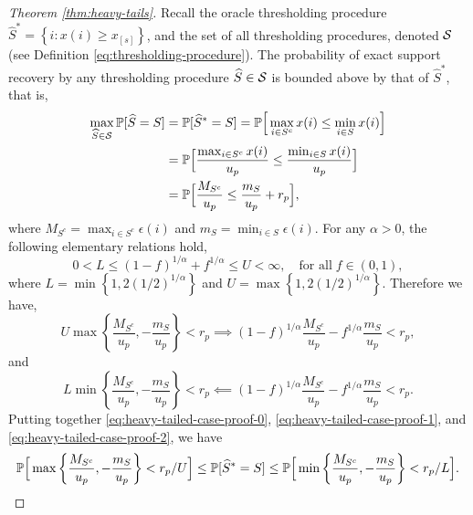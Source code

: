 \begin{proof}[Theorem \ref{thm:heavy-tails}]
Recall the oracle thresholding procedure $\widehat{S}^* = \left\{i:x(i) \ge x_{[s]}\right\}$, and the set of all thresholding procedures, denoted 
${\cal S}$ (see Definition \ref{eq:thresholding-procedure}).
The probability of exact support recovery by any thresholding procedure $\widehat{S}\in{\cal S}$ is bounded above by that of $\widehat{S}^*$, that is,
\begin{align}
    \max_{\widehat{S}\in{\cal S}}\P[\widehat{S}=S] 
        &= \P[\widehat{S}^*=S] 
        = \P\Big[\max_{i\in S^c}x(i) \le \min_{i\in S}x(i)\Big] \nonumber \\
        &= \P\Big[\frac{\max_{i\in S^c}x(i)}{u_p} \le \frac{\min_{i\in S}x(i)}{u_p}\Big] \nonumber \\
        &= \P\Big[\frac{M_{S^c}}{u_p} \le \frac{m_S}{u_p} + r_p\Big], \label{eq:heavy-tailed-case-proof-0}
\end{align}
where $M_{S^c} = \max_{i\in S^c}\epsilon(i)$ and $m_S = \min_{i\in S}\epsilon(i)$.
For any $\alpha > 0$, the following elementary relations hold,
\begin{equation*}
    0 < L \le (1-f)^{1/\alpha} + f^{1/\alpha} \le U < \infty, \quad \text{for all} \; f\in(0,1),
\end{equation*}
where $L = \min\left\{1, 2(1/2)^{1/\alpha}\right\}$ and $U = \max\left\{1, 2(1/2)^{1/\alpha}\right\}$.
Therefore we have,
\begin{equation} \label{eq:heavy-tailed-case-proof-1}
    U\max\left\{\frac{M_{S^c}}{u_p}, -\frac{m_S}{u_p}\right\} < r_p
    \implies
    (1-f)^{1/\alpha}\frac{M_{S^c}}{u_p} - f^{1/\alpha}\frac{m_S}{u_p} < r_p,
\end{equation}
and 
\begin{equation} \label{eq:heavy-tailed-case-proof-2}
    L\min\left\{\frac{M_{S^c}}{u_p}, -\frac{m_S}{u_p}\right\} < r_p
    \impliedby
    (1-f)^{1/\alpha}\frac{M_{S^c}}{u_p} - f^{1/\alpha}\frac{m_S}{u_p} < r_p.
\end{equation}
Putting together \eqref{eq:heavy-tailed-case-proof-0}, \eqref{eq:heavy-tailed-case-proof-1}, and \eqref{eq:heavy-tailed-case-proof-2}, we have
\begin{equation} \label{eq:heavy-tailed-case-proof-3}
    \P\Big[\max\left\{\frac{M_{S^c}}{u_p}, -\frac{m_S}{u_p}\right\} < r_p/U\Big]
    \le \P[\widehat{S}^*=S]
    \le \P\Big[\min\left\{\frac{M_{S^c}}{u_p}, -\frac{m_S}{u_p}\right\} < r_p/L\Big].

\end{equation}
\end{proof}
